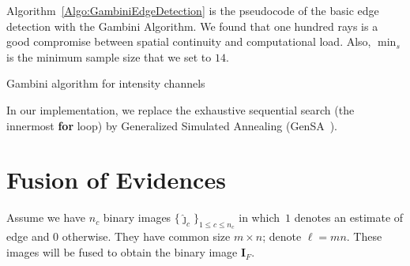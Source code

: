 \documentclass[journal]{IEEEtran}
\begin{document}
Algorithm~\ref{Algo:GambiniEdgeDetection} is the pseudocode of the basic edge detection with the Gambini Algorithm.
We found that one hundred rays is a good compromise between spatial continuity and computational load.
Also, $\min_s$ is the minimum sample size that we set to $14$.

\begin{algorithm}[hbt]
\SetAlgoLined
{}
\caption{Gambini algorithm for intensity channels}\label{Algo:GambiniEdgeDetection}
\end{algorithm}

In our implementation, we replace the exhaustive sequential search (the innermost \textbf{for} loop) by Generalized Simulated Annealing (GenSA~\cite{xgsh}).


\section{Fusion of Evidences}\label{sec_04}

Assume we have $n_c$ binary images $\{\widehat{\bm\jmath}_c\}_{1\leq c\leq n_c}$ in which~$1$ denotes an estimate of edge and $0$ otherwise.
They have common size $m\times n$; denote $\ell=mn$.
These images will be fused to obtain the binary image $\bm I_F$.
\end{document}
